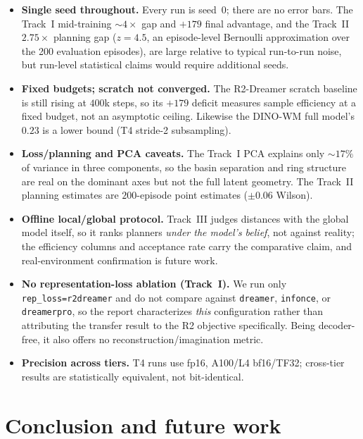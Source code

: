 \documentclass[11pt,a4paper]{article}
\begin{document}
\begin{itemize}[leftmargin=1.4em,itemsep=2pt]
\item \textbf{Single seed throughout.} Every run is seed~0; there are no error
bars. The Track~I mid-training ${\sim}4\times$ gap and $+179$ final advantage,
and the Track~II $2.75\times$ planning gap ($z{=}4.5$, an episode-level Bernoulli
approximation over the 200 evaluation episodes), are large relative to typical
run-to-run noise, but run-level statistical claims would require additional seeds.
\item \textbf{Fixed budgets; scratch not converged.} The R2-Dreamer scratch
baseline is still rising at $400$k steps, so its $+179$ deficit measures sample
efficiency at a fixed budget, not an asymptotic ceiling. Likewise the DINO-WM
full model's $0.23$ is a lower bound (T4 stride-2 subsampling).
\item \textbf{Loss/planning and PCA caveats.} The Track~I PCA explains only
$\sim\!17\%$ of variance in three components, so the basin separation and ring
structure are real on the dominant axes but not the full latent geometry. The
Track~II planning estimates are $200$-episode point estimates ($\pm0.06$
Wilson).
\item \textbf{Offline local/global protocol.} Track~III judges distances with
the global model itself, so it ranks planners \emph{under the model's belief},
not against reality; the efficiency columns and acceptance rate carry the
comparative claim, and real-environment confirmation is future work.
\item \textbf{No representation-loss ablation (Track~I).} We run only
\texttt{rep\_loss=r2dreamer} and do not compare against \texttt{dreamer},
\texttt{infonce}, or \texttt{dreamerpro}, so the report characterizes \emph{this}
configuration rather than attributing the transfer result to the R2 objective
specifically. Being decoder-free, it also offers no reconstruction/imagination
metric.
\item \textbf{Precision across tiers.} T4 runs use fp16, A100/L4 bf16/TF32;
cross-tier results are statistically equivalent, not bit-identical.
\end{itemize}

\section{Conclusion and future work}
\label{sec:future}
\end{document}
